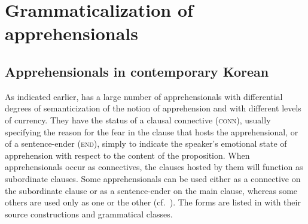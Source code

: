\documentclass[output=paper,colorlinks,citecolor=brown]{langscibook}
\begin{document}
\section{Grammaticalization of apprehensionals}
\label{sec:rhee:grammaticalization}

\subsection{Apprehensionals in contemporary Korean}
\label{subsec:appinKorean}

As indicated earlier,  has a large number of apprehensionals with differential degrees of semanticization of the notion of apprehension and with different levels of currency. They have the status of a clausal connective (\textsc{conn}), usually specifying the reason for the fear in the clause that hosts the apprehensional, or of a sentence-ender (\textsc{end}), simply to indicate the speaker's emotional state of apprehension with respect to the content of the proposition. When apprehensionals occur as connectives, the clauses hosted by them will function as subordinate clauses. Some apprehensionals can be used either as a connective on the subordinate clause or as a sentence-ender on the main clause, whereas some others are used only as one or the other (cf.\ \citealt{Ramstedt1997,Kim1960,Ko1989,Son1994}). The forms are listed in  with their source constructions and grammatical classes. 
\end{document}
